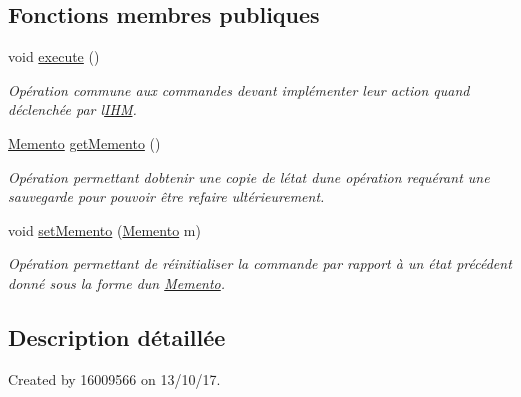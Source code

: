 \subsection*{Fonctions membres publiques}
\begin{DoxyCompactItemize}
\item 
\mbox{\label{classfr_1_1istic_1_1m1_1_1aco_1_1miniediteur_1_1v1_1_1Selectionner_a746abe8d1a13dbb084f37d4b67fa1261}} 
void \hyperlink{classfr_1_1istic_1_1m1_1_1aco_1_1miniediteur_1_1v1_1_1Selectionner_a746abe8d1a13dbb084f37d4b67fa1261}{execute} ()
\begin{DoxyCompactList}\small\item\em Opération commune aux commandes devant implémenter leur action quand déclenchée par l\textquotesingle{}\hyperlink{interfacefr_1_1istic_1_1m1_1_1aco_1_1miniediteur_1_1v1_1_1IHM}{I\+HM}. \end{DoxyCompactList}\item 
\hyperlink{interfacefr_1_1istic_1_1m1_1_1aco_1_1miniediteur_1_1v1_1_1Memento}{Memento} \hyperlink{classfr_1_1istic_1_1m1_1_1aco_1_1miniediteur_1_1v1_1_1Selectionner_a93bb9249ee51f501735f6b40d77dc3f3}{get\+Memento} ()
\begin{DoxyCompactList}\small\item\em Opération permettant d\textquotesingle{}obtenir une copie de l\textquotesingle{}état d\textquotesingle{}une opération requérant une sauvegarde pour pouvoir être refaire ultérieurement. \end{DoxyCompactList}\item 
void \hyperlink{classfr_1_1istic_1_1m1_1_1aco_1_1miniediteur_1_1v1_1_1Selectionner_a80d7d18546f239290919a9e602405ffd}{set\+Memento} (\hyperlink{interfacefr_1_1istic_1_1m1_1_1aco_1_1miniediteur_1_1v1_1_1Memento}{Memento} m)
\begin{DoxyCompactList}\small\item\em Opération permettant de réinitialiser la commande par rapport à un état précédent donné sous la forme d\textquotesingle{}un \hyperlink{interfacefr_1_1istic_1_1m1_1_1aco_1_1miniediteur_1_1v1_1_1Memento}{Memento}. \end{DoxyCompactList}\end{DoxyCompactItemize}


\subsection{Description détaillée}
Created by 16009566 on 13/10/17. 

